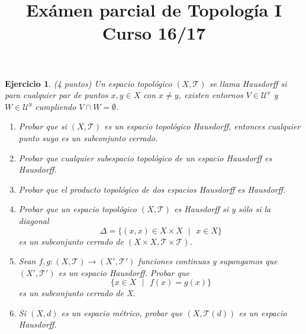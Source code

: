 \documentclass{article}
\theoremstyle{remark,bold} \newtheorem{exercise}{Ejercicio}
\begin{document}
\title{Exámen parcial de Topología I \\ Curso 16/17}
\date{}
\maketitle

\begin{exercise} (4 puntos) Un espacio topológico $(X, \mathcal{T})$
  se llama Hausdorff si para cualquier par de puntos $x, y \in X$ con $x
  \neq y$, existen entornos $V \in \mathcal{U}^x$ y $W \in
  \mathcal{U}^y$ cumpliendo $V \cap W = \emptyset$.

  \begin{enumerate}
    
  \item Probar que si $(X, \mathcal{T})$ es un espacio topológico
    Hausdorff, entonces cualquier punto suyo es un subconjunto cerrado.
    
  \item Probar que cualquier subespacio topológico de un espacio
    Hausdorff es Hausdorff.
    
  \item Probar que el producto topológico de dos espacios Hausdorff es
    Hausdorff.
    
  \item Probar que un espacio topológico $(X, \mathcal{T})$ es
    Hausdorff si y sólo si la diagonal
    \[\Delta = \{(x,x) \in X \times X \text{ }| \text{ } x \in X\}\]
    es un subconjunto cerrado de $(X \times X, \mathcal{T} \times
    \mathcal{T})$.
    
  \item Sean $f,g : (X,\mathcal{T}) \longrightarrow (X',
    \mathcal{T}')$ funciones continuas y supongamos que $(X',
    \mathcal{T}')$ es un espacio Hausdorff. Probar que
    \[\{x \in X \text{ } | \text { } f(x) = g (x)\}\] es un
    subconjunto cerrado de X.
    
  \item Si $(X, d)$ es un espacio métrico, probar que $(X,
    \mathcal{T}(d))$ es un espacio Hausdorff.
    
  \end{enumerate}
  
\end{exercise}
\end{document}
